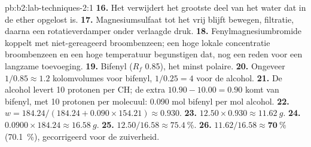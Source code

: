 \begin{solution}{pb:b2:lab-techniques-2:1}
\textbf{16.} Het verwijdert het grootste deel van het water dat in de ether opgelost is.
\textbf{17.} Magnesiumsulfaat tot het vrij blijft bewegen, filtratie, daarna een rotatieverdamper onder verlaagde
druk.
\textbf{18.} Fenylmagnesiumbromide koppelt met niet-gereageerd broombenzeen; een hoge lokale concentratie
broombenzeen en een hoge temperatuur begunstigen dat, nog een reden voor een langzame toevoeging.
\textbf{19.} Bifenyl ($R_f$ 0.85), het minst polaire.
\textbf{20.} Ongeveer $1/0.85 \approx 1.2$ kolomvolumes voor bifenyl, $1/0.25 = 4$ voor de alcohol.
\textbf{21.} De alcohol levert 10  protonen per CH; de extra $10.90 - 10.00 = 0.90$ komt van
bifenyl, met 10 protonen per molecuul: 0.090 mol bifenyl per mol alcohol.
\textbf{22.} $w = 184.24/(184.24 + 0.090 \times 154.21) \approx 0.930$.
\textbf{23.} $12.50 \times 0.930 \approx \qty{11.62}{g}$.
\textbf{24.} $0.0900 \times 184.24 \approx \qty{16.58}{g}$.
\textbf{25.} $12.50/16.58 \approx 75.4~\%$.
\textbf{26.} $11.62/16.58 \approx \boldsymbol{70~\%}$ (70.1~\%), gecorrigeerd voor de zuiverheid.
\end{solution}
